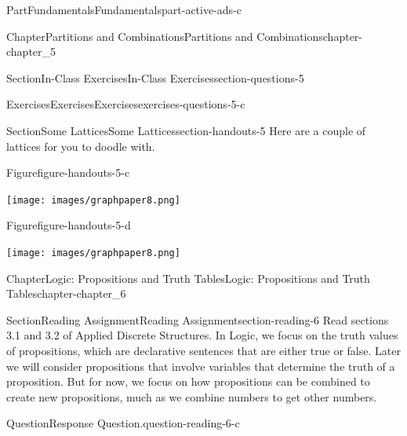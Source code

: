 \documentclass[oneside,10pt,]{book}
\numberwithin{equation}{section}
\begin{document}
\begin{partptx}{Part}{Fundamentals}{}{Fundamentals}{}{}{part-active-ads-c}
\begin{chapterptx}{Chapter}{Partitions and Combinations}{}{Partitions and Combinations}{}{}{chapter-chapter_5}
\begin{sectionptx}{Section}{In-Class Exercises}{}{In-Class Exercises}{}{}{section-questions-5}
\begin{exercises-subsection-numberless}{Exercises}{Exercises}{}{Exercises}{}{}{exercises-questions-5-c}
\par\medskip\noindent
\end{exercises-subsection-numberless}
\end{sectionptx}
%
%
\typeout{************************************************}
\typeout{************************************************}
%
\begin{sectionptx}{Section}{Some Lattices}{}{Some Lattices}{}{}{section-handouts-5}
Here are a couple of lattices for you to doodle with.%
\begin{figureptx}{Figure}{}{figure-handouts-5-c}{}%
\begin{image}{0.175}{0.65}{0.175}{}%
\texttt{[image: images/graphpaper8.png]}
\end{image}%
\tcblower
\end{figureptx}%
\begin{figureptx}{Figure}{}{figure-handouts-5-d}{}%
\begin{image}{0.175}{0.65}{0.175}{}%
\texttt{[image: images/graphpaper8.png]}
\end{image}%
\tcblower
\end{figureptx}%
\end{sectionptx}
\end{chapterptx}
%
\typeout{************************************************}
\typeout{************************************************}
%
\begin{chapterptx}{Chapter}{Logic: Propositions and Truth Tables}{}{Logic: Propositions and Truth Tables}{}{}{chapter-chapter_6}
\renewcommand*{\chaptername}{Chapter}
%
%
%
\typeout{************************************************}
\typeout{************************************************}
%
\begin{sectionptx}{Section}{Reading Assignment}{}{Reading Assignment}{}{}{section-reading-6}
Read sections 3.1 and 3.2 of Applied Discrete Structures.  In Logic, we focus on the truth values of propositions, which are declarative sentences that are either true or false.  Later we will consider propositions that involve variables that determine the truth of a proposition. But for now, we focus on how propositions can be combined to create new propositions, much as we combine numbers to get other numbers.%
\begin{question}{Question}{Response Question.}{question-reading-6-c}%

\end{question}
\end{sectionptx}
\end{chapterptx}
\end{partptx}
\end{document}
